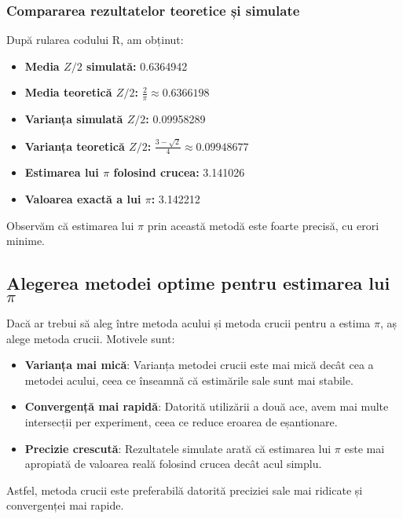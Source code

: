 \documentclass{article}
\begin{document}
\subsubsection*{Compararea rezultatelor teoretice și simulate}

După rularea codului R, am obținut:

\begin{itemize}
    \item \textbf{Media \( Z/2 \) simulată:} 0.6364942
    \item \textbf{Media teoretică \( Z/2 \):} \( \frac{2}{\pi} \approx 0.6366198 \)
    \item \textbf{Varianța simulată \( Z/2 \):}  0.09958289
    \item \textbf{Varianța teoretică \( Z/2 \):} \( \frac{3 - \sqrt{2}}{4} \approx 0.09948677 \)
        \item \textbf{Estimarea lui \( \pi \) folosind crucea:} 3.141026 
    \item \textbf{Valoarea exactă a lui \( \pi \):} 3.142212 
\end{itemize}

Observăm că estimarea lui \( \pi \) prin această metodă este foarte precisă, cu erori minime.

\subsection*{Alegerea metodei optime pentru estimarea lui \(\pi\)}

Dacă ar trebui să aleg între metoda acului și metoda crucii pentru a estima \( \pi \), aș alege metoda crucii. Motivele sunt:

\begin{itemize}
    \item \textbf{Varianța mai mică}: Varianța metodei crucii este mai mică decât cea a metodei acului, ceea ce înseamnă că estimările sale sunt mai stabile.
    \item \textbf{Convergență mai rapidă}: Datorită utilizării a două ace, avem mai multe intersecții per experiment, ceea ce reduce eroarea de eșantionare.
    \item \textbf{Precizie crescută}: Rezultatele simulate arată că estimarea lui \( \pi \) este mai apropiată de valoarea reală folosind crucea decât acul simplu.
\end{itemize}

Astfel, metoda crucii este preferabilă datorită preciziei sale mai ridicate și convergenței mai rapide.
\end{document}
